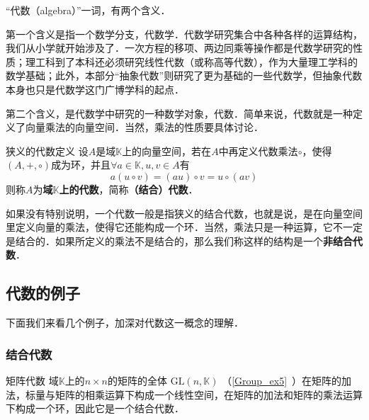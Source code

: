 

“代数（algebra）”一词，有两个含义．

第一个含义是指一个数学分支，代数学．代数学研究集合中各种各样的运算结构，我们从小学就开始涉及了．一次方程的移项、两边同乘等操作都是代数学研究的性质；理工科到了本科还必须研究线性代数（或称高等代数），作为大量理工学科的数学基础；此外，本部分“抽象代数”则研究了更为基础的一些代数学，但抽象代数本身也只是代数学这门广博学科的起点．

第二个含义，是代数学中研究的一种数学对象，代数．简单来说，代数就是一种定义了向量乘法的向量空间．当然，乘法的性质要具体讨论．



\begin{definition}{狭义的代数定义}
设$A$是域$\mathbb{K}$上的向量空间，若在$A$中再定义代数乘法$\circ$，使得$(A,+,\circ)$成为环，并且$\forall a\in \mathbb{K}, u, v\in A$有
\begin{equation}
a(u \circ v)=(a u) \circ v=u{\circ}(a v)
\end{equation}
则称$A$为\textbf{域$\mathbb{K}$上的代数}，简称\textbf{（结合）代数}．

\end{definition}

如果没有特别说明，一个代数一般是指狭义的结合代数，也就是说，是在向量空间里定义向量的乘法，使得它还能构成一个环．当然，乘法只是一种运算，它不一定是结合的．如果所定义的乘法不是结合的，那么我们称这样的结构是一个\textbf{非结合代数}．


\subsection{代数的例子}
下面我们来看几个例子，加深对代数这一概念的理解．

\subsubsection{结合代数}

\begin{example}{矩阵代数}
域$\mathbb{K}$上的$n\times n$的矩阵的全体 $\mathrm{GL}(n, \mathbb{K})$ （\autoref{Group_ex5}~）在矩阵的加法，标量与矩阵的相乘运算下构成一个线性空间，在矩阵的加法和矩阵的乘法运算下构成一个环，因此它是一个结合代数．
\end{example}

